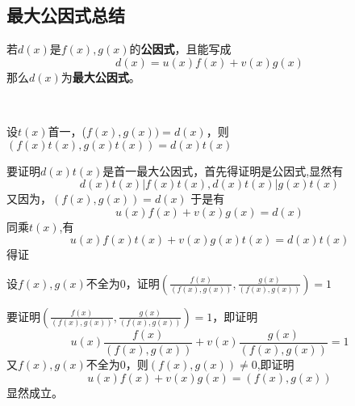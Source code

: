 \documentclass[lang=cn,10pt]{elegantbook}
\begin{document}
\subsection{最大公因式总结}
\begin{conclusion}
	
	若$d(x)$是$f(x),g(x)$的\textbf{公因式}，且能写成
	\begin{equation*}
		d(x)=u(x)f(x)+v(x)g(x)
	\end{equation*}
	那么$d(x)$为\textbf{最大公因式}。
	
	~\\
	
\end{conclusion}
\begin{example}
	设$t(x)$首一，($f(x),g(x))=d(x)$，则$(f(x)t(x),g(x)t(x))=d(x)t(x)$
\end{example}
\begin{solution}
	
	要证明$d(x)t(x)$是首一最大公因式，首先得证明是公因式,显然有
	\begin{equation*}
		d(x)t(x)|f(x)t(x),d(x)t(x)|g(x)t(x)
	\end{equation*}
	又因为，$(f(x),g(x))=d(x)$
	于是有
	\begin{equation*}
		u(x)f(x)+v(x)g(x)=d(x)
	\end{equation*}
	同乘$t(x)$,有
	\begin{equation*}
		u(x)f(x)t(x)+v(x)g(x)t(x)=d(x)t(x)
	\end{equation*}
	得证
\end{solution}
\begin{example}
	设$f(x),g(x)$不全为0，证明$\left( \frac{f\left( x \right)}{\left( f\left( x \right) ,g\left( x \right) \right)},\frac{g\left( x \right)}{\left( f\left( x \right) ,g\left( x \right) \right)} \right) =1
	$
\end{example}
\begin{solution}
	
	要证明$\left( \frac{f\left( x \right)}{\left( f\left( x \right) ,g\left( x \right) \right)},\frac{g\left( x \right)}{\left( f\left( x \right) ,g\left( x \right) \right)} \right) =1
	$，即证明
	\begin{equation*}
		u(x)
		\frac{f\left( x \right)}{\left( f\left( x \right) ,g\left( x \right) \right)}
		+v(x)
		\frac{g\left( x \right)}{\left( f\left( x \right) ,g\left( x \right) \right)}
		=1
	\end{equation*}
	又$f(x),g(x)$不全为0，则$(f(x),g(x))\ne0$,即证明
	\begin{equation*}
		u(x)f(x)+v(x)g(x)=(f(x),g(x))
	\end{equation*}
	显然成立。
\end{solution}
\end{document}
